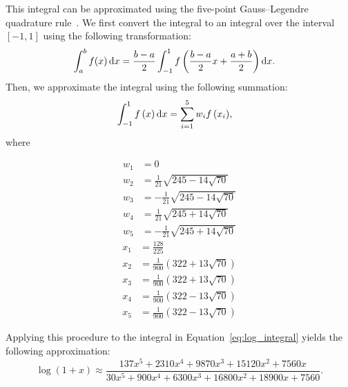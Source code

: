 This integral can be approximated using the five-point Gauss--Legendre quadrature rule~\cite{kythe_quadrature_2002}. We first convert the integral to an integral over the interval $[-1,1]$ using the following transformation:
\begin{align*}
	\int_a^b{f(x)\mathop{}\!\mathrm{d} x}
	&= \frac{b-a}{2}\int_{-1}^{1}{f\left(\frac{b-a}{2}x+\frac{a+b}{2}\right)\mathop{}\!\mathrm{d} x}.
\end{align*}
Then, we approximate the integral using the following summation:
\begin{align*}
	\int_{-1}^{1}{f\left(x\right)\mathop{}\!\mathrm{d} x} &= \sum_{i=1}^{5}{w_i f\left(x_i\right)},
\end{align*}
where
\begin{multicols}{2}
	\noindent
	\begin{align*}
		w_1 &= 0\\
		w_2 &= \frac{1}{21}\sqrt{245-14\sqrt{70}}\\
		w_3 &= -\frac{1}{21}\sqrt{245-14\sqrt{70}}\\
		w_4 &= \frac{1}{21}\sqrt{245+14\sqrt{70}}\\
		w_5 &= -\frac{1}{21}\sqrt{245+14\sqrt{70}}
	\end{align*}
	\columnbreak
	\begin{align*}
		x_1 &= \frac{128}{225}\\
		x_2 &= \frac{1}{900}\left( 322 + 13\sqrt{70}\right)\\
		x_3 &= \frac{1}{900}\left( 322 + 13\sqrt{70}\right)\\
		x_4 &= \frac{1}{900}\left( 322 - 13\sqrt{70}\right)\\
		x_5 &= \frac{1}{900}\left( 322 - 13\sqrt{70}\right)
	\end{align*}
\end{multicols}
Applying this procedure to the integral in Equation~\ref{eq:log_integral} yields the following approximation:
\begin{equation}\label{eq:standard_logarithm_quadrature}
	\log\left(1+x\right) \approx
	\frac{137x^5 + 2310x^4 + 9870x^3 + 15120x^2 + 7560x}
	{30x^5 + 900x^4 + 6300x^3 + 16800x^2 + 18900x + 7560}.
\end{equation}

